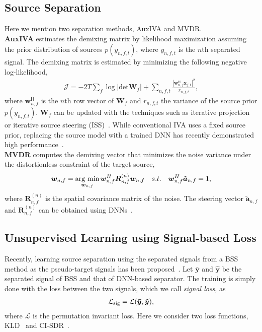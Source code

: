 \documentclass[a4paper]{article}
\newcommand{\argmin}{\mathop{\rm arg~min}\limits} %
\begin{document}
\subsection{Source Separation}
\label{subsec:separation}
Here we mention two separation methods, AuxIVA and MVDR.
\\
\textbf{AuxIVA} estimates the demixing matrix by likelihood maximization assuming the prior distribution of sources $p(y_{n,f,t})$, where $y_{n,f,t}$ is the $n$th separated signal.
The demixing matrix is estimated by minimizing the following negative log-likelihood,
\begin{align}
  \label{eqn:iva-cost}
    \mathcal{J}=-2T\sum_{f}\log|\mathrm{det}{\bm{W}_f}| + 
    \sum_{n,f,t} \frac{|\bm{w}^{\mathsf{H}}_{n,f}\bm{x}_{f,t}|^2}{r_{n,f,t}},
\end{align}
where $\bm{w}^{\mathsf{H}}_{n,f}$ is the $n$th row vector of $\bm{W}_{f}$ and $r_{n,f,t}$ the variance of the source prior $p(y_{n,f,t})$.
$\bm{W}_{f}$ can be updated with the techniques such as iterative projection~\cite{auxiva_ip} or iterative source steering (ISS)~\cite{iss}.
While conventional IVA uses a fixed source prior, replacing the source model with a trained DNN has recently demonstrated high performance~\cite{auxiva-iss-dnn}.
\\
\textbf{MVDR} computes the demixing vector that minimizes the noise variance under the distortionless constraint of the target source,
\begin{align}
  \label{eqn:mvdr_problem}
    {\bm{w}}_{n,f} = \argmin_{\bm{w}_{n,f}} {{{\bm{w}^{H}_{n,f}}}{\bm{R}^{(n)}_{n,f}}{\bm{w}}_{n,f}} ~~~s.t.~~~ {\bm{w}^{H}_{n,f}}{\tilde{\bm{a}}_{n,f}} = 1,
\end{align}
where ${\bm{R}^{(n)}_{n,f}}$ is the spatial covariance matrix of the noise.
The steering vector ${\tilde{\bm{a}}_{n,f}}$ and ${\bm{R}^{(n)}_{n,f}}$ can be obtained using DNNs~\cite{mvdr_heymann}.



\subsection{Unsupervised Learning using Signal-based Loss}
\label{subsec:sig_loss}
Recently, learning source separation using the separated signals from a BSS method as the pseudo-target signals has been proposed~\cite{Drude-unsup,Togami-unsup-kld}.
Let $\bm{\bar{y}}$ and $\bm{\hat{y}}$ be the separated signal of BSS and that of DNN-based separator.
The training is simply done with the loss between the two signals, which we call \textit{signal loss}, as 
\begin{align}
  \label{eqn:sig_loss}
    \mathcal{L}_{\rm{sig}} = \mathcal{L}(\bm{\bar{y}}, \bm{\hat{y}}),
\end{align}
where $\mathcal{L}$ is the permutation invariant loss.
Here we consider two loss functions, KLD~\cite{Togami-unsup-kld} and CI-SDR~\cite{cisdr}.
\end{document}
